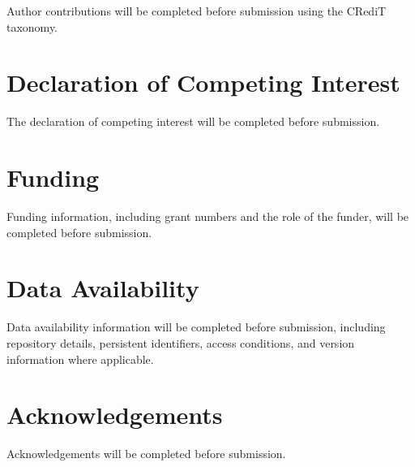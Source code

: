 \documentclass[11pt,a4paper]{article}
\begin{document}
Author contributions will be completed before submission using the CRediT taxonomy.

\section*{Declaration of Competing Interest}

The declaration of competing interest will be completed before submission.

\section*{Funding}

Funding information, including grant numbers and the role of the funder, will be completed before submission.

\section*{Data Availability}

Data availability information will be completed before submission, including repository details, persistent identifiers, access conditions, and version information where applicable.

\section*{Acknowledgements}

Acknowledgements will be completed before submission.



\end{document}
